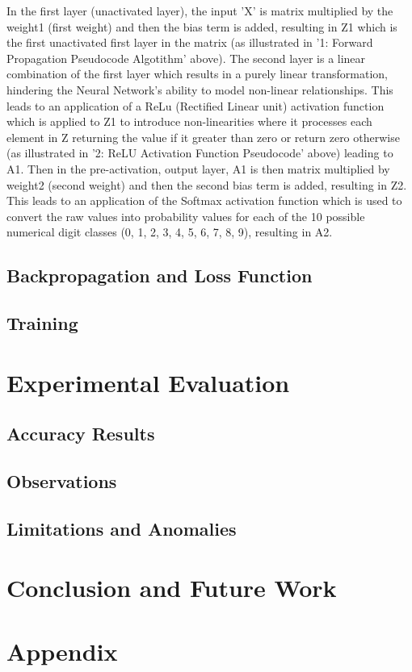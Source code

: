 \documentclass[11pt]{article}
\begin{document}
\vspace{1em}
In the first layer (unactivated layer), the input 'X' is matrix multiplied by the weight1 (first weight) and then the bias term is added, resulting in Z1 which is the first unactivated first layer in the matrix (as illustrated in '1: Forward Propagation Pseudocode Algotithm' above). The second layer is a linear combination of the first layer which results in a purely linear transformation, hindering the Neural Network's ability to model non-linear relationships. This leads to an application of a ReLu (Rectified Linear unit) activation function which is applied to Z1 to introduce non-linearities where it processes each element in Z returning the value if it greater than zero or return zero otherwise (as illustrated in '2: ReLU Activation Function Pseudocode' above) leading to A1. Then in the pre-activation, output layer, A1 is then matrix multiplied by weight2 (second weight) and then the second bias term is added, resulting in Z2. This leads to an application of the Softmax activation function which is used to convert the raw values into probability values for each of the 10 possible numerical digit classes (0, 1, 2, 3, 4, 5, 6, 7, 8, 9), resulting in A2.


\subsection{Backpropagation and Loss Function}

\subsection{Training}

\section{Experimental Evaluation}
\subsection{Accuracy Results}

\subsection{Observations}

\subsection{Limitations and Anomalies}

\section{Conclusion and Future Work}

\appendix
\section*{Appendix}

\begin{thebibliography}{9}
\end{thebibliography}
\end{document}
